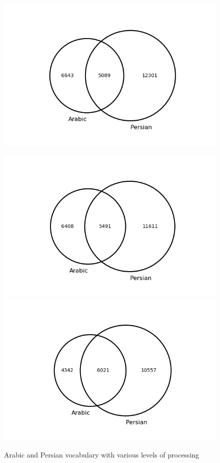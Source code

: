 \documentclass[12pt, oneside]{report}
\begin{document}
\begin{figure}
	\begin{minipage}{\linewidth}
		\centering\captionsetup[subfigure]{justification=centering}
		\includegraphics[width=\linewidth]{figures/venn-proc-one-freq5.png}
		\subcaption{}
		\label{fig:char-norm-a}\par\vfill
		\includegraphics[width=\linewidth]{figures/venn-proc-two-freq5.png}
		\subcaption{}
		\label{fig:char-norm-b}
		\includegraphics[width=\linewidth]{figures/venn-proc-three-freq5.png}
		\subcaption{}
		\label{fig:char-norm-c}
	\end{minipage}
	\caption[Venn diagrams depicting the effects of various processing decisions]{Arabic and Persian vocabulary with various levels of processing}\label{fig:char-norm}
\end{figure}
\end{document}
